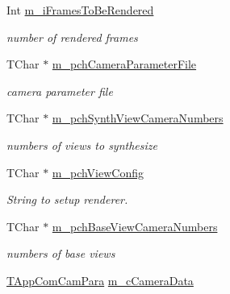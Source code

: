 \begin{DoxyCompactItemize}
Int \hyperlink{class_t_app_renderer_cfg_afff9fec6eb3139afb11f9322cac34cc3}{m\+\_\+i\+Frames\+To\+Be\+Rendered}
\begin{DoxyCompactList}\small\item\em number of rendered frames \end{DoxyCompactList}\item 
\mbox{\label{class_t_app_renderer_cfg_a19e37254b9c46abbbc69d782e21d1fc6}} 
T\+Char $\ast$ \hyperlink{class_t_app_renderer_cfg_a19e37254b9c46abbbc69d782e21d1fc6}{m\+\_\+pch\+Camera\+Parameter\+File}
\begin{DoxyCompactList}\small\item\em camera parameter file \end{DoxyCompactList}\item 
\mbox{\label{class_t_app_renderer_cfg_ad29a12ae87c8059f061af96d69db4027}} 
T\+Char $\ast$ \hyperlink{class_t_app_renderer_cfg_ad29a12ae87c8059f061af96d69db4027}{m\+\_\+pch\+Synth\+View\+Camera\+Numbers}
\begin{DoxyCompactList}\small\item\em numbers of views to synthesize \end{DoxyCompactList}\item 
\mbox{\label{class_t_app_renderer_cfg_af5809dd0510a39786dea9dfc78f49567}} 
T\+Char $\ast$ \hyperlink{class_t_app_renderer_cfg_af5809dd0510a39786dea9dfc78f49567}{m\+\_\+pch\+View\+Config}
\begin{DoxyCompactList}\small\item\em String to setup renderer. \end{DoxyCompactList}\item 
\mbox{\label{class_t_app_renderer_cfg_a2dc479787bc78d66f5ecbd80c2e6ef67}} 
T\+Char $\ast$ \hyperlink{class_t_app_renderer_cfg_a2dc479787bc78d66f5ecbd80c2e6ef67}{m\+\_\+pch\+Base\+View\+Camera\+Numbers}
\begin{DoxyCompactList}\small\item\em numbers of base views \end{DoxyCompactList}\item 
\mbox{\label{class_t_app_renderer_cfg_a2b6f23082a01c351d1afa0bcce52bf16}} 
\hyperlink{class_t_app_com_cam_para}{T\+App\+Com\+Cam\+Para} \hyperlink{class_t_app_renderer_cfg_a2b6f23082a01c351d1afa0bcce52bf16}{m\+\_\+c\+Camera\+Data}

\end{DoxyCompactItemize}
